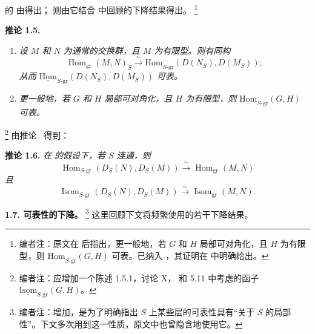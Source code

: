的  由得出； 则由它结合  中回顾的下降结果得出。
\footnote{编者注：原文在  后指出，更一般地，若 \(G\) 和 \(H\) 局部可对角化，且 \(H\) 为有限型，则 \(\operatorname{\underline{Hom}}_{S\text{-}\mathrm{gr}}(G,H)\) 可表。已纳入 ，其证明在  中明确给出。}

\medskip
\noindent{}\textbf{推论 1.5.}
\begin{enumerate}
  \item[(a)]
  \textit{设 \(M\) 和 \(N\) 为通常的交换群，且 \(M\) 为有限型。则有同构}
  \[
    \operatorname{Hom}_{\mathrm{gr}}(M,N)_S
    \xrightarrow{\ \sim\ }
    \operatorname{\underline{Hom}}_{S\text{-}\mathrm{gr}}
      (D(N_S),D(M_S));
  \]
  \textit{从而 \(\operatorname{\underline{Hom}}_{S\text{-}\mathrm{gr}}
  (D(N_S),D(M_S))\) 可表。}

  \item[(b)]
  \textit{更一般地，若 \(G\) 和 \(H\) 局部可对角化，且 \(H\) 为有限型，则 \(\operatorname{\underline{Hom}}_{S\text{-}\mathrm{gr}}(G,H)\) 可表。}
\end{enumerate}

\footnote{编者注：应增加一个陈述 1.5.1，讨论 X， 和 5.11 中考虑的函子 \(\operatorname{\underline{Isom}}_{S\text{-}\mathrm{gr}}(G,H)\)。}
由推论~ 得到：

\medskip
\noindent{}\textbf{推论 1.6.}
\textit{在  的假设下，若 \(S\) 连通，则}
\[
  \operatorname{Hom}_{S\text{-}\mathrm{gr}}(D_S(N),D_S(M))
  \xrightarrow{\ \sim\ }
  \operatorname{Hom}_{\mathrm{gr}}(M,N)
\]
\textit{且}
\[
  \operatorname{Isom}_{S\text{-}\mathrm{gr}}(D_S(N),D_S(M))
  \xrightarrow{\ \sim\ }
  \operatorname{Isom}_{\mathrm{gr}}(M,N).
\]

\medskip
\noindent{}\textbf{1.7. 可表性的下降。}
\footnote{编者注：增加，是为了明确指出 \(S\) 上某些层的可表性具有“关于 \(S\) 的局部性”。下文多次用到这一性质，原文中也曾隐含地使用它。}
这里回顾下文将频繁使用的若干下降结果。


